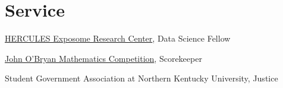 \section{Service}

\href{https://emoryhercules.com}{HERCULES Exposome Research Center}, Data Science Fellow \hfill {}

\href{https://www.nku.edu/academics/artsci/about/departments/math/about/competitions/obryan.html}{John O'Bryan Mathematics Competition}, Scorekeeper \hfill  {}

Student Government Association at Northern Kentucky University, Justice \hfill {}

